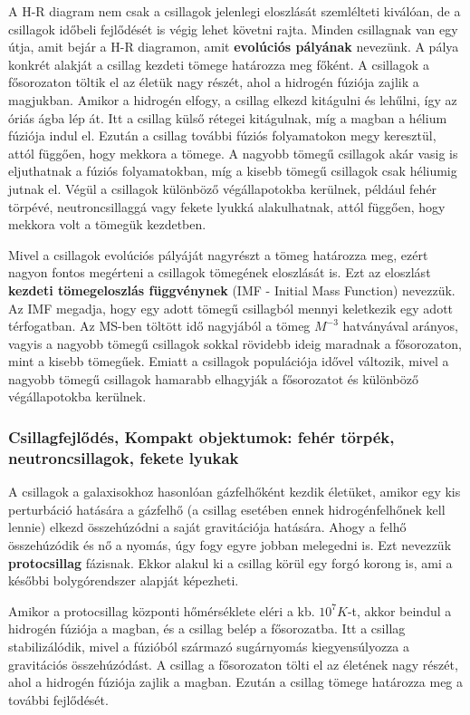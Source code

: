 \documentclass[../main.tex]{subfiles}
\begin{document}
A H-R diagram nem csak a csillagok jelenlegi eloszlását szemlélteti kiválóan, de a csillagok időbeli fejlődését is végig lehet követni rajta. Minden csillagnak van egy útja, amit bejár a H-R diagramon,
amit \textbf{evolúciós pályának} nevezünk. A pálya konkrét alakját a csillag kezdeti tömege határozza meg főként. A csillagok a fősorozaton töltik el az életük nagy részét, ahol a hidrogén fúziója zajlik a magjukban.
Amikor a hidrogén elfogy, a csillag elkezd kitágulni és lehűlni, így az óriás ágba lép át. Itt a csillag külső rétegei kitágulnak, míg a magban a hélium fúziója indul el. Ezután a csillag további fúziós folyamatokon megy keresztül,
attól függően, hogy mekkora a tömege. A nagyobb tömegű csillagok akár vasig is eljuthatnak a fúziós folyamatokban, míg a kisebb tömegű csillagok csak héliumig jutnak el. Végül a csillagok különböző végállapotokba kerülnek,
például fehér törpévé, neutroncsillaggá vagy fekete lyukká alakulhatnak, attól függően, hogy mekkora volt a tömegük kezdetben.

Mivel a csillagok evolúciós pályáját nagyrészt a tömeg határozza meg, ezért nagyon fontos megérteni a csillagok tömegének eloszlását is. Ezt az eloszlást \textbf{kezdeti tömegeloszlás függvénynek} (IMF - Initial Mass Function) nevezzük.
Az IMF megadja, hogy egy adott tömegű csillagból mennyi keletkezik egy adott térfogatban. Az MS-ben töltött idő nagyjából a tömeg $M^{-3}$ hatványával arányos, vagyis a nagyobb tömegű csillagok sokkal rövidebb ideig maradnak a fősorozaton,
mint a kisebb tömegűek. Emiatt a csillagok populációja idővel változik, mivel a nagyobb tömegű csillagok hamarabb elhagyják a fősorozatot és különböző végállapotokba kerülnek.

\subsubsection{Csillagfejlődés, Kompakt objektumok: fehér törpék, neutroncsillagok, fekete lyukak}
A csillagok a galaxisokhoz hasonlóan gázfelhőként kezdik életüket, amikor egy kis perturbáció hatására a gázfelhő (a csillag esetében ennek hidrogénfelhőnek kell lennie) elkezd összehúzódni a saját gravitációja hatására.
Ahogy a felhő összehúzódik és nő a nyomás, úgy fogy egyre jobban melegedni is. Ezt nevezzük \textbf{protocsillag} fázisnak. Ekkor alakul ki a csillag körül egy forgó korong is, ami a későbbi bolygórendszer alapját képezheti.

Amikor a protocsillag központi hőmérséklete eléri a kb. $10^7 K$-t, akkor beindul a hidrogén fúziója a magban, és a csillag belép a fősorozatba. Itt a csillag stabilizálódik, mivel a fúzióból származó sugárnyomás kiegyensúlyozza
a gravitációs összehúzódást. A csillag a fősorozaton tölti el az életének nagy részét, ahol a hidrogén fúziója zajlik a magban. Ezután a csillag tömege határozza meg a további fejlődését.
\end{document}
